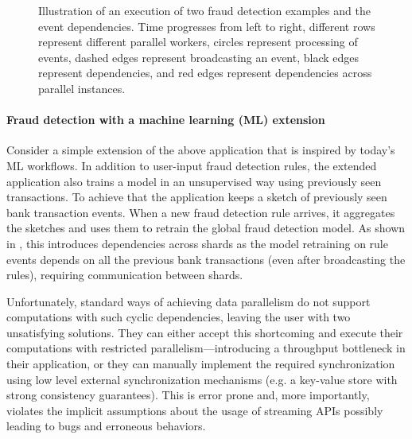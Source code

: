 \begin{figure}[t]
    \caption{Illustration of an execution of two fraud detection
      examples and the event dependencies. Time progresses from left to right,
            different rows represent different parallel workers,
                  circles represent processing of
      events, dashed edges represent broadcasting an event,
            black edges represent dependencies, and red edges
      represent dependencies across parallel instances.
      }
    \label{fig:dependencies-vis}
\end{figure}



\paragraph{Fraud detection with a machine learning (ML) extension}
Consider a simple extension of the above application that is inspired
by today's ML workflows. In addition to user-input fraud detection
rules, the extended application also trains a model in an unsupervised
way using previously seen transactions. To achieve that the application keeps a sketch of previously seen bank transaction events. When a new fraud detection rule arrives, it aggregates the sketches and uses them to retrain the global fraud detection model.
As shown in
,
this introduces dependencies across shards as the model retraining on rule events depends on all the previous bank transactions (even after broadcasting the rules), requiring communication between shards.

Unfortunately, standard ways of achieving data parallelism do not
support computations with such cyclic dependencies, leaving the user with two
unsatisfying solutions. They can either accept this
shortcoming and execute their computations with restricted parallelism---introducing
a throughput bottleneck in their application, or they can manually
implement the required synchronization using low level external
synchronization mechanisms (e.g. a key-value store with strong
consistency guarantees). This is error prone and, more importantly,
violates the implicit assumptions about the usage of
streaming APIs possibly leading to bugs and
erroneous behaviors.

